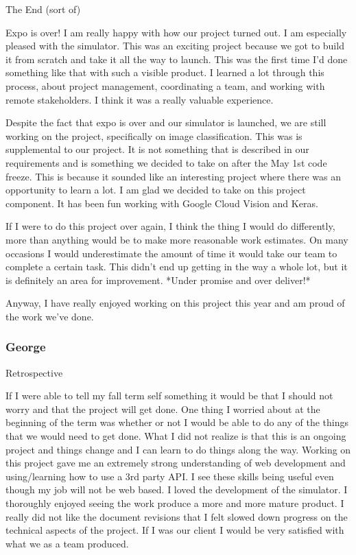 \documentclass[10pt, onecolumn, draftclsnofoot, letterpaper, compsoc]{IEEEtran}
\begin{document}
    The End (sort of)

    Expo is over! I am really happy with how our project turned out. I am especially pleased with the simulator.
    This was an exciting project because we got to build it from scratch and take it all the way to launch. This
    was the first time I'd done something like that with such a visible product. I learned a lot through this process,
    about project management, coordinating a team, and working with remote stakeholders. I think it was a really
    valuable experience.

    Despite the fact that expo is over and our simulator is launched, we are still working on the project,
    specifically on image classification. This was is supplemental to our project. It is not something that is
    described in our requirements and is something we decided to take on after the May 1st code freeze. This
    is because it sounded like an interesting project where there was an opportunity to learn a lot. I am glad
    we decided to take on this project component. It has been fun working with Google Cloud Vision and Keras.

    If I were to do this project over again, I think the thing I would do differently, more than anything
    would be to make more reasonable work estimates. On many occasions I would underestimate the amount of time
    it would take our team to complete a certain task. This didn't end up getting in the way a whole lot, but
    it is definitely an area for improvement. *Under promise and over deliver!*

    Anyway, I have really enjoyed working on this project this year and am proud of the work we've done.


    \subsubsection{George}

    Retrospective

    If I were able to tell my fall term self something it would be that I should not
    worry and that the project will get done. One thing I worried about at the beginning
    of the term was whether or not I would be able to do any of the things that we would
    need to get done. What I did not realize is that this is an ongoing project and things
    change and I can learn to do things along the way. Working on this project gave me
    an extremely strong understanding of web development and using/learning how to use a
    3rd party API. I see these skills being useful even though my job will not be web based.
    I loved the development of the simulator. I thoroughly enjoyed seeing the work produce
    a more and more mature product. I really did not like the document revisions that I felt
    slowed down progress on the technical aspects of the project. If I was our client I
    would be very satisfied with what we as a team produced.
\end{document}
